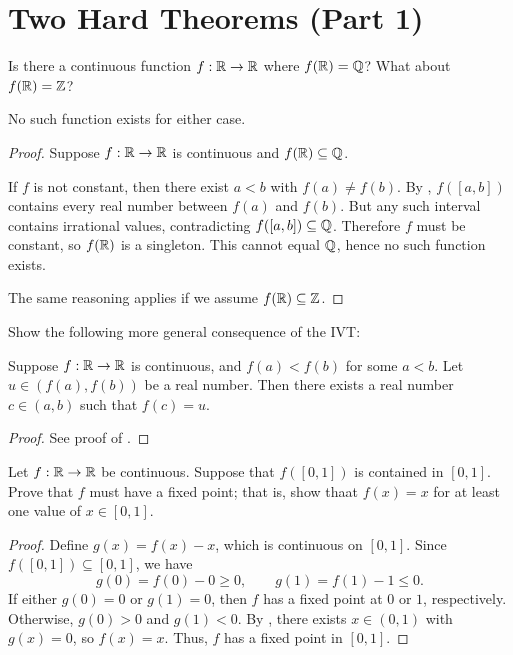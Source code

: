 \section{Two Hard Theorems (Part 1)}

\begin{problem}
  Is there a continuous function $f : \mathbb{R} \to \mathbb{R}$ where $f(\mathbb{R}) = \mathbb{Q}$? What about $f(\mathbb{R}) = \mathbb{Z}$?

  \vspace{\baselineskip}

  No such function exists for either case.

  \begin{proof}
    Suppose $f : \mathbb{R} \to \mathbb{R}$ is continuous and $f(\mathbb{R}) \subseteq \mathbb{Q}$. 

    If $f$ is not constant, then there exist $a<b$ with $f(a) \neq f(b)$. By
    , $f([a,b])$ contains every real
    number between $f(a)$ and $f(b)$. But any such interval contains irrational
    values, contradicting $f([a,b]) \subseteq \mathbb{Q}$. Therefore $f$ must be
    constant, so $f(\mathbb{R})$ is a singleton. This cannot equal $\mathbb{Q}$, hence no such
    function exists.

    The same reasoning applies if we assume $f(\mathbb{R}) \subseteq \mathbb{Z}$.
  \end{proof}

\end{problem}

\begin{problem}
  Show the following more general consequence of the IVT:

  Suppose $f: \mathbb{R} \to \mathbb{R}$ is continuous, and $f(a) < f(b)$ for some $a < b$. Let
  $u \in (f(a), f(b))$ be a real number. Then there exists a real number $c \in
  (a, b)$ such that $f(c) = u$.

  \begin{proof} 
    See proof of .
  \end{proof} 
\end{problem}

\begin{problem}
  Let $f : \mathbb{R} \to \mathbb{R}$ be continuous. Suppose that $f([0, 1])$ is contained in $[0, 1]$. Prove that 
  $f$ must have a fixed point; that is, show thaat $f(x) = x$ for at least one value of $x \in [0, 1]$.

  \begin{proof}
    Define $g(x) = f(x) - x$, which is continuous on $[0,1]$.
    Since $f([0,1]) \subseteq [0,1]$, we have
    \[
      g(0) = f(0) - 0 \geq 0, \qquad g(1) = f(1) - 1 \leq 0.
    \]
    If either $g(0) = 0$ or $g(1) = 0$, then $f$ has a fixed point at $0$ or $1$, respectively.
    Otherwise, $g(0) > 0$ and $g(1) < 0$. By ,
    there exists $x \in (0,1)$ with $g(x) = 0$, so $f(x) = x$.
    Thus, $f$ has a fixed point in $[0,1]$.
  \end{proof}
\end{problem}

